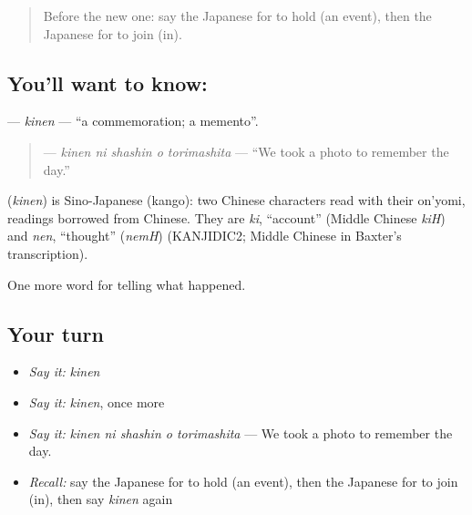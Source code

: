 \label{lesson:JA-C285-kinen}



\begin{quote}
Before the new one: say the Japanese for to hold (an event), then the Japanese for to join (in).
\end{quote}

\subsection*{You'll want to know: }
\textbf{} — \emph{kinen} — \textquotedblleft{}a commemoration; a memento\textquotedblright{}.

\begin{quote}
\textbf{  } — \emph{kinen ni shashin o torimashita} — \textquotedblleft{}We took a photo to remember the day.\textquotedblright{}
\end{quote}

\begin{cousinweb}
\textbf{} (\emph{kinen}) is Sino-Japanese (kango): two Chinese characters read with their on'yomi, readings borrowed from Chinese. They are \emph{ki}, \textquotedblleft{}account\textquotedblright{} (Middle Chinese \emph{kiH}) and \emph{nen}, \textquotedblleft{}thought\textquotedblright{} (\emph{nemH}) (KANJIDIC2; Middle Chinese in Baxter's transcription).
\end{cousinweb}

\begin{grammarlens}[title={What you've built}]
One more word for telling what happened.
\end{grammarlens}

\subsection*{Your turn}
\begin{itemize}
\raggedright
  \item \emph{Say it:} \emph{kinen}
  \item \emph{Say it:} \emph{kinen}, once more
  \item \emph{Say it:} \emph{kinen ni shashin o torimashita} — We took a photo to remember the day.
  \item \emph{Recall:} say the Japanese for to hold (an event), then the Japanese for to join (in), then say \emph{kinen} again
\end{itemize}

